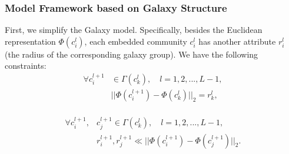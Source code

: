 \documentclass{article}
\theoremstyle{definition}
\newcommand{\origin}[1]{{\color{blue}{#1}}}
\newcommand{\new}[1]{{\color{red}{#1}}}
\begin{document}
	 \subsubsection{Model Framework based on Galaxy Structure}
	 First, we simplify the Galaxy model. \origin{We suppose that the distances from each galaxy to the center of its galaxy group are equal. In other words, all galaxies are located at a spherical surface.} \new{We suppose that galaxies are located at a spherical surface. In other words, the distances from each galaxy to the center of its galaxy group are equal.} Specifically, besides the Euclidean representation $\Phi(c_i^l)$, each embedded community $c_i^l$ has another attribute $r_i^l$ (the radius of the corresponding galaxy group). We have the following constraints:
	 \begin{equation}
	 \label{equ:sphere_constraints}
	 \begin{split}
	 	\forall c_i^{l+1} & \in \Gamma(c_k^l), \quad l = 1, 2, ..., L - 1,\\
	 	& ||\Phi(c_i^{l+1})  - \Phi(c_k^l)||_2= r_k^l, \\
	 \end{split}
	 \end{equation}
	 
	 \begin{equation}
	 \label{equ:galaxy_constraints}
	 \begin{split}
	 	\forall c_i^{l+1}, & c_j^{l+1} \in \Gamma(c_k^l), \quad l = 1, 2, ..., L - 1,\\
	 	&r_i^{l+1}, r_j^{l+1} \ll ||\Phi(c_i^{l+1}) - \Phi(c_j^{l+1})||_2. \\
	 \end{split}
	 \end{equation}
\end{document}
